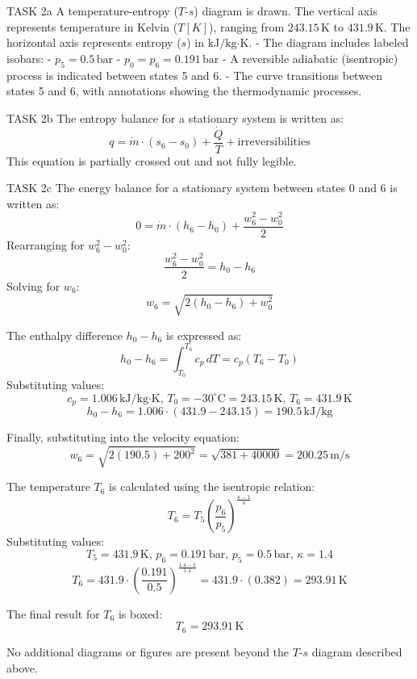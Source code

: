TASK 2a  
A temperature-entropy (\( T \)-\( s \)) diagram is drawn. The vertical axis represents temperature in Kelvin (\( T [K] \)), ranging from \( 243.15 \, \text{K} \) to \( 431.9 \, \text{K} \). The horizontal axis represents entropy (\( s \)) in \( \text{kJ/kg·K} \).  
- The diagram includes labeled isobars:  
  - \( p_5 = 0.5 \, \text{bar} \)  
  - \( p_0 = p_6 = 0.191 \, \text{bar} \)  
- A reversible adiabatic (isentropic) process is indicated between states 5 and 6.  
- The curve transitions between states 5 and 6, with annotations showing the thermodynamic processes.  

TASK 2b  
The entropy balance for a stationary system is written as:  
\[
q = \dot{m} \cdot (s_6 - s_0) + \frac{\dot{Q}}{T} + \text{irreversibilities}
\]  
This equation is partially crossed out and not fully legible.  

TASK 2c  
The energy balance for a stationary system between states 0 and 6 is written as:  
\[
0 = \dot{m} \cdot (h_6 - h_0) + \frac{w_6^2 - w_0^2}{2}
\]  
Rearranging for \( w_6^2 - w_0^2 \):  
\[
\frac{w_6^2 - w_0^2}{2} = h_0 - h_6
\]  
Solving for \( w_6 \):  
\[
w_6 = \sqrt{2(h_0 - h_6) + w_0^2}
\]  

The enthalpy difference \( h_0 - h_6 \) is expressed as:  
\[
h_0 - h_6 = \int_{T_0}^{T_6} c_p \, dT = c_p (T_6 - T_0)
\]  
Substituting values:  
\[
c_p = 1.006 \, \text{kJ/kg·K}, \, T_0 = -30^\circ\text{C} = 243.15 \, \text{K}, \, T_6 = 431.9 \, \text{K}
\]  
\[
h_0 - h_6 = 1.006 \cdot (431.9 - 243.15) = 190.5 \, \text{kJ/kg}
\]  

Finally, substituting into the velocity equation:  
\[
w_6 = \sqrt{2(190.5) + 200^2} = \sqrt{381 + 40000} = 200.25 \, \text{m/s}
\]  

The temperature \( T_6 \) is calculated using the isentropic relation:  
\[
T_6 = T_5 \left( \frac{p_6}{p_5} \right)^{\frac{\kappa - 1}{\kappa}}
\]  
Substituting values:  
\[
T_5 = 431.9 \, \text{K}, \, p_6 = 0.191 \, \text{bar}, \, p_5 = 0.5 \, \text{bar}, \, \kappa = 1.4
\]  
\[
T_6 = 431.9 \cdot \left( \frac{0.191}{0.5} \right)^{\frac{1.4 - 1}{1.4}} = 431.9 \cdot (0.382) = 293.91 \, \text{K}
\]  

The final result for \( T_6 \) is boxed:  
\[
T_6 = 293.91 \, \text{K}
\]  

No additional diagrams or figures are present beyond the \( T \)-\( s \) diagram described above.